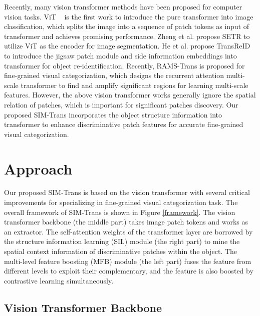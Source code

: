 \documentclass[sigconf, nonacm]{acmart}
\begin{document}
Recently, many vision transformer methods have been proposed for computer vision tasks. ViT ~\cite{dosovitskiy2020image} is the first work to introduce the pure transformer into image classification, which splits the image into a sequence of patch tokens as input of transformer and achieves promising performance. Zheng et al. \cite{zheng2021rethinking} propose SETR to utilize ViT as the encoder for image segmentation. He et al. \cite{he2021transreid} propose TransReID to introduce the jigsaw patch module and side information embeddings into transformer for object re-identification. Recently, RAMS-Trans \cite{hu2021rams} is proposed for fine-grained visual categorization, which designs the recurrent attention multi-scale transformer to find and amplify significant regions for learning multi-scale features. However, the above vision transformer works generally ignore the spatial relation of patches, which is important for significant patches discovery. Our proposed SIM-Trans incorporates the object structure information into transformer to enhance discriminative patch features for accurate fine-grained visual categorization.







\section{Approach}








Our proposed SIM-Trans is based on the vision transformer with several critical improvements for specializing in fine-grained visual categorization task. The overall framework of SIM-Trans is shown in Figure \ref{framework}. The vision transformer backbone (the middle part) takes image patch tokens and works as an extractor. The self-attention weights of the transformer layer are borrowed by the structure information learning (SIL) module (the right part) to mine the spatial context information of discriminative patches within the object. The multi-level feature boosting (MFB) module (the left part) fuses the feature from different levels to exploit their complementary, and the feature is also boosted by contrastive learning simultaneously.



\subsection{Vision Transformer Backbone} \label{ViT}
\end{document}
